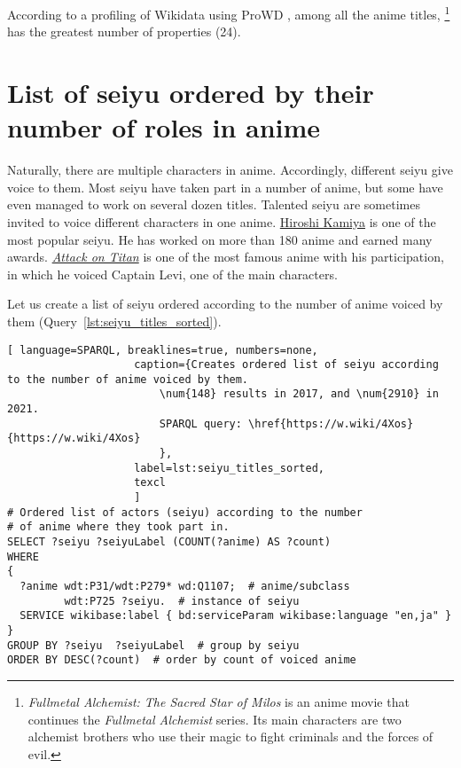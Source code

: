 According to a profiling of Wikidata using ProWD \autocite{anime_prowd}, among all the anime titles, \footnote{\emph{Fullmetal Alchemist: The Sacred Star of Milos} is an anime movie that continues the \emph{Fullmetal Alchemist} series. Its main characters are two alchemist brothers who use their magic to fight criminals and the forces of evil.} has the greatest number of properties (\num{24}).

\section{List of seiyu ordered by their number of roles in anime}

Naturally, there are multiple characters in anime. Accordingly, different seiyu give voice to them. Most seiyu have taken part in a number of anime, but some have even managed to work on several dozen titles. Talented seiyu are sometimes invited to voice different characters in one anime. \href{https://w.wiki/4UFa}{Hiroshi Kamiya} is one of the most popular seiyu. He has worked on more than 180 anime and earned many awards. \href{https://w.wiki/4UFh}{\emph{Attack on Titan}} is one of the most famous anime with his participation, in which he voiced Captain Levi, one of the main characters.

Let us create a list of seiyu ordered according to the number of anime voiced by them (Query~\ref{lst:seiyu_titles_sorted}).

\begin{lstlisting}[ language=SPARQL, breaklines=true, numbers=none,
                    caption={Creates ordered list of seiyu according to the number of anime voiced by them.
                        \num{148} results in 2017, and \num{2910} in 2021.
                        SPARQL query: \href{https://w.wiki/4Xos}{https://w.wiki/4Xos}
                        },
                    label=lst:seiyu_titles_sorted,
                    texcl 
                    ]
# Ordered list of actors (seiyu) according to the number
# of anime where they took part in.
SELECT ?seiyu ?seiyuLabel (COUNT(?anime) AS ?count)
WHERE
{
  ?anime wdt:P31/wdt:P279* wd:Q1107;  # anime/subclass
         wdt:P725 ?seiyu.  # instance of seiyu
  SERVICE wikibase:label { bd:serviceParam wikibase:language "en,ja" }
}
GROUP BY ?seiyu  ?seiyuLabel  # group by seiyu 
ORDER BY DESC(?count)  # order by count of voiced anime
\end{lstlisting}%


